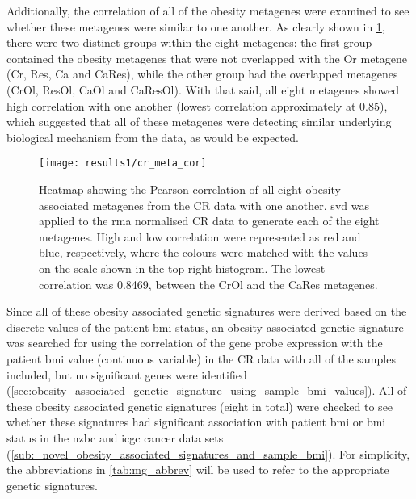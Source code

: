 Additionally, the correlation of all of the obesity metagenes were examined to see whether these metagenes were similar to one another.
As clearly shown in \cref{fig:cr_meta_cor}, there were two distinct groups within the eight metagenes: the first group contained the obesity metagenes that were not overlapped with the Or metagene (Cr, Res, Ca and CaRes), while the other group had the overlapped metagenes (CrOl, ResOl, CaOl and CaResOl).
With that said, all eight metagenes showed high correlation with one another (lowest correlation approximately at 0.85), which suggested that all of these metagenes were detecting similar underlying biological mechanism from the data, as would be expected.

\begin{figure}[htpb]
	\centering
	\texttt{[image: results1/cr\_meta\_cor]}
	\caption[Pearson correlation of all eight obesity metagenes identified in the CR data]{Heatmap showing the Pearson correlation of all eight obesity associated metagenes from the CR data with one another.
	\gls{svd} was applied to the \gls{rma} normalised CR data to generate each of the eight metagenes.
	High and low correlation were represented as red and blue, respectively, where the colours were matched with the values on the scale shown in the top right histogram.
	The lowest correlation was 0.8469, between the CrOl and the CaRes metagenes.
	}
	\label{fig:cr_meta_cor}
\end{figure}

Since all of these obesity associated genetic signatures were derived based on the discrete values of the patient \gls{bmi} status, an obesity associated genetic signature was searched for using the correlation of the gene probe expression with the patient \gls{bmi} value (continuous variable) in the CR data with all of the samples included, but no significant genes were identified (\cref{sec:obesity_associated_genetic_signature_using_sample_bmi_values}).
All of these obesity associated genetic signatures (eight in total) were checked to see whether these signatures had significant association with patient \gls{bmi} or \gls{bmi} status in the \gls{nzbc} and \gls{icgc} cancer data sets (\cref{sub:_novel_obesity_associated_signatures_and_sample_bmi}).
For simplicity, the abbreviations in \cref{tab:mg_abbrev} will be used to refer to the appropriate genetic signatures.

